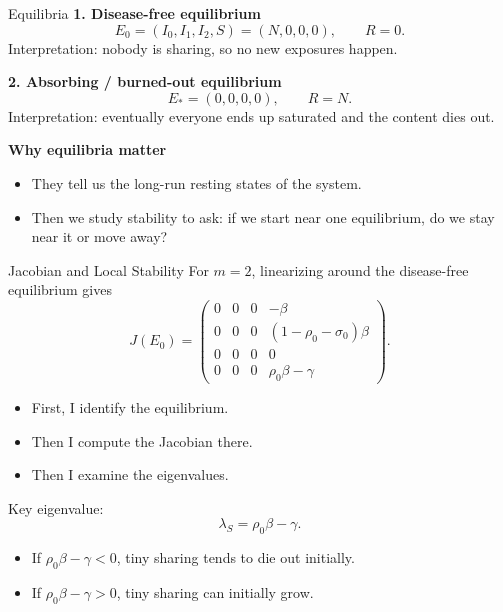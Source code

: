 \documentclass[aspectratio=169]{beamer}
\begin{document}
\begin{frame}{Equilibria}
  \textbf{1. Disease-free equilibrium}
  \[
  E_0=(I_0,I_1,I_2,S)=(N,0,0,0), \qquad R=0.
  \]
  Interpretation: nobody is sharing, so no new exposures happen.

  \vspace{0.6em}
  \textbf{2. Absorbing / burned-out equilibrium}
  \[
  E_\ast=(0,0,0,0), \qquad R=N.
  \]
  Interpretation: eventually everyone ends up saturated and the content dies out.

  \vspace{0.6em}
  \textbf{Why equilibria matter}
  \begin{itemize}
    \item They tell us the long-run resting states of the system.
    \item Then we study stability to ask: if we start near one equilibrium, do we stay near it or move away?
  \end{itemize}
\end{frame}

\begin{frame}{Jacobian and Local Stability}
  For $m=2$, linearizing around the disease-free equilibrium gives
  \[
  J(E_0)=
  \begin{pmatrix}
  0 & 0 & 0 & -\beta \\
  0 & 0 & 0 & (1-\rho_0-\sigma_0)\beta \\
  0 & 0 & 0 & 0 \\
  0 & 0 & 0 & \rho_0\beta-\gamma
  \end{pmatrix}.
  \]

  \begin{itemize}
    \item First, I identify the equilibrium.
    \item Then I compute the Jacobian there.
    \item Then I examine the eigenvalues.
  \end{itemize}

  \vspace{0.4em}
  Key eigenvalue:
  \[
  \lambda_S=\rho_0\beta-\gamma.
  \]

  \begin{itemize}
    \item If $\rho_0\beta-\gamma<0$, tiny sharing tends to die out initially.
    \item If $\rho_0\beta-\gamma>0$, tiny sharing can initially grow.
  \end{itemize}
\end{frame}
\end{document}
